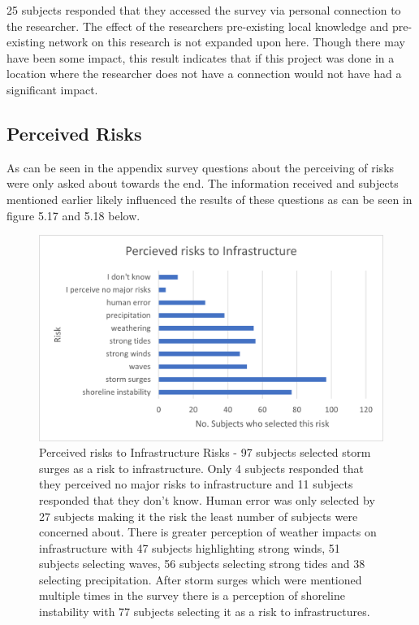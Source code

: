 25 subjects responded that they accessed the survey via personal connection to the researcher. The effect of the researchers pre-existing local knowledge and pre-existing network on this research is not expanded upon here. Though there may have been some impact, this result indicates that if this project was done in a location where the researcher does not have a connection would not have had a significant impact. 

\subsection{Perceived Risks}
As can be seen in the appendix survey questions about the perceiving of risks were only asked about towards the end. The information received and subjects mentioned earlier likely influenced the results of these questions as can be seen in figure 5.17 and 5.18 below.

\begin{figure}[H]
    \centering
    \includegraphics{fig_results/infrastructure-risks.png}
    \caption{Perceived risks to Infrastructure Risks - 97 subjects selected storm surges as a risk to infrastructure. Only 4 subjects responded that they perceived no major risks to infrastructure and 11 subjects responded that they don't know. Human error was only selected by 27 subjects making it the risk the least number of subjects were concerned about. There is greater perception of weather impacts on infrastructure with 47 subjects highlighting strong winds, 51 subjects selecting waves, 56 subjects selecting strong tides and 38 selecting precipitation. After storm surges which were mentioned multiple times in the survey there is a perception of shoreline instability with 77 subjects selecting it as a risk to infrastructures.   }
    \label{fig:my_label}
\end{figure}
